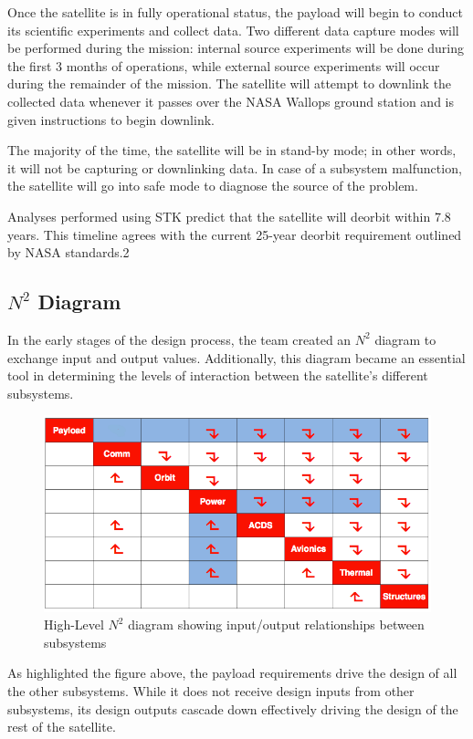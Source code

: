 \documentclass[12pt]{article}
\begin{document}
		Once the satellite is in fully operational status, the payload will begin to conduct its scientific experiments and collect data. Two different data capture modes will be performed during the mission: internal source experiments will be done during the first 3 months of operations, while external source experiments will occur during the remainder of the mission. The satellite will attempt to downlink the collected data whenever it passes over the NASA Wallops ground station and is given instructions to begin downlink. 

The majority of the time, the satellite will be in stand-by mode; in other words, it will not be capturing or downlinking data. In case of a subsystem malfunction, the satellite will go into safe mode to diagnose the source of the problem. 

Analyses performed using STK predict that the satellite will deorbit within 7.8 years. This timeline agrees with the current 25-year deorbit requirement outlined by NASA standards.2

		\subsection{$N^2$ Diagram}
		
		In the early stages of the design process, the team created an $N^2$ diagram to exchange input and output values. Additionally, this diagram became an essential tool in determining the levels of interaction between the satellite’s different subsystems. 
		
		\begin{figure}[!ht]
				\centering
				\includegraphics[width=5in]{images/MissionOverview_2.png}
				\caption{High-Level $N^2$ diagram showing input/output relationships between subsystems}
				\label{fig:Mission_N2}
			\end{figure}
			
		As highlighted the figure above, the payload requirements drive the design of all the other subsystems. While it does not receive design inputs from other subsystems, its design outputs cascade down effectively driving the design of the rest of the satellite. 
\end{document}
